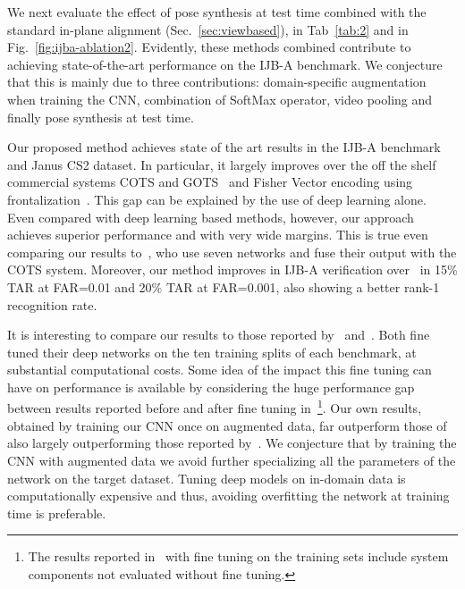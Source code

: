 \documentclass[runningheads]{llncs}
\newcommand{\minisection}[1]{\vspace{0.04in} \noindent {\bf #1:} }
\begin{document}
We next evaluate the effect of pose synthesis at test time combined with the standard in-plane alignment (Sec.~\ref{sec:viewbased}), in Tab~\ref{tab:2} and in Fig.~\ref{fig:ijba-ablation2}. Evidently, these methods combined contribute to achieving state-of-the-art performance on the IJB-A benchmark. We conjecture that this is mainly due to three contributions: domain-specific augmentation when training the CNN, combination of SoftMax operator, video pooling and finally pose synthesis at test time.




\minisection{Comparison with the state-of-the-art}
Our proposed method achieves state of the art results in the IJB-A benchmark and Janus CS2 dataset. In particular, it largely improves over the off the shelf commercial systems COTS and GOTS~\cite{klare2015pushing} and Fisher Vector encoding using frontalization~\cite{umd:FV}. This gap can be explained by the use of deep learning alone. Even compared with deep learning based methods, however, our approach achieves superior performance and with very wide margins. This is true even comparing our results to~\cite{80Msearch}, who use seven networks and fuse their output with the COTS system. Moreover, our method improves in IJB-A verification over~\cite{80Msearch}
in 15\% TAR at FAR=0.01 and 20\% TAR at FAR=0.001, also showing a better rank-1 recognition rate. 

It is interesting to compare our results to those reported by~\cite{chen2015unconstrained} and~\cite{Swami:UMD}. Both fine tuned their deep networks on the ten training splits of each benchmark, at substantial computational costs. Some idea of the impact this fine tuning can have on performance is available by considering the huge performance gap between results reported before and after fine tuning in~\cite{chen2015unconstrained}\footnote{The results reported in~\cite{chen2015unconstrained} with fine tuning on the training sets include system components not evaluated without fine tuning.}. Our own results, obtained by training our CNN once on augmented data, far outperform those of~\cite{Swami:UMD} also largely outperforming those reported by~\cite{chen2015unconstrained}. We conjecture that by training the CNN with augmented data we avoid further specializing all the parameters of the network on the target dataset. Tuning deep models on in-domain data is computationally expensive and thus, avoiding overfitting the network at training time is preferable.
\end{document}
